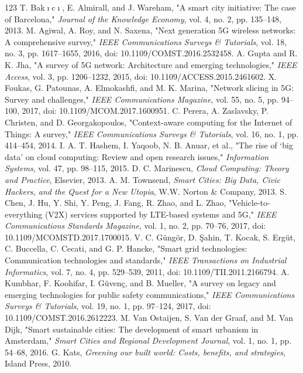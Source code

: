 \documentclass[journal]{IEEEtran}
\begin{document}
\begin{thebibliography}{123}
 T. Bak$\imath$c$\imath$, E. Almirall, and J. Wareham, "A smart city initiative: The case of Barcelona," \emph{Journal of the Knowledge Economy}, vol. 4, no. 2, pp. 135--148, 2013.
 M. Agiwal, A. Roy, and N. Saxena, "Next generation 5G wireless networks: A comprehensive survey," \emph{IEEE Communications Surveys \& Tutorials}, vol. 18, no. 3, pp. 1617--1655, 2016, doi: 10.1109/COMST.2016.2532458.
 A. Gupta and R. K. Jha, "A survey of 5G network: Architecture and emerging technologies," \emph{IEEE Access}, vol. 3, pp. 1206--1232, 2015, doi: 10.1109/ACCESS.2015.2461602.
 X. Foukas, G. Patounas, A. Elmokashfi, and M. K. Marina, "Network slicing in 5G: Survey and challenges," \emph{IEEE Communications Magazine}, vol. 55, no. 5, pp. 94--100, 2017, doi: 10.1109/MCOM.2017.1600951.
 C. Perera, A. Zaslavsky, P. Christen, and D. Georgakopoulos, "Context-aware computing for the Internet of Things: A survey," \emph{IEEE Communications Surveys \& Tutorials}, vol. 16, no. 1, pp. 414--454, 2014.
 I. A. T. Hashem, I. Yaqoob, N. B. Anuar, et al., "The rise of `big data' on cloud computing: Review and open research issues," \emph{Information Systems}, vol. 47, pp. 98--115, 2015.
 D. C. Marinescu, \emph{Cloud Computing: Theory and Practice}, Elsevier, 2013.
 A. M. Townsend, \emph{Smart Cities: Big Data, Civic Hackers, and the Quest for a New Utopia}, W.W. Norton \& Company, 2013.
 S. Chen, J. Hu, Y. Shi, Y. Peng, J. Fang, R. Zhao, and L. Zhao, "Vehicle-to-everything (V2X) services supported by LTE-based systems and 5G," \emph{IEEE Communications Standards Magazine}, vol. 1, no. 2, pp. 70--76, 2017, doi: 10.1109/MCOMSTD.2017.1700015.
 V. C. G\"ung\"or, D. \c{S}ahin, T. Kocak, S. Erg\"ut, C. Buccella, C. Cecati, and G. P. Hancke, "Smart grid technologies: Communication technologies and standards," \emph{IEEE Transactions on Industrial Informatics}, vol. 7, no. 4, pp. 529--539, 2011, doi: 10.1109/TII.2011.2166794.
 A. Kumbhar, F. Koohifar, I. G\"uven\c{c}, and B. Mueller, "A survey on legacy and emerging technologies for public safety communications," \emph{IEEE Communications Surveys \& Tutorials}, vol. 19, no. 1, pp. 97--124, 2017, doi: 10.1109/COMST.2016.2612223.
 M. Van Ostaijen, S. Van der Graaf, and M. Van Dijk, "Smart sustainable cities: The development of smart urbanism in Amsterdam," \emph{Smart Cities and Regional Development Journal}, vol. 1, no. 1, pp. 54--68, 2016.
 G. Kats, \emph{Greening our built world: Costs, benefits, and strategies}, Island Press, 2010.

\end{thebibliography}
\end{document}

